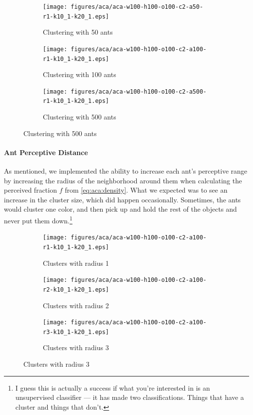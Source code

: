 \documentclass[12pt]{article}
\begin{document}
\begin{figure}[H]
    \begin{subfigure}[b]{0.32\textwidth}
        \centering
        \texttt{[image: figures/aca/aca-w100-h100-o100-c2-a50-r1-k10\_1-k20\_1.eps]}
        \caption{Clustering with 50 ants}\label{fig:aca:num-ants-50}
    \end{subfigure}
    \begin{subfigure}[b]{0.32\textwidth}
        \centering
        \texttt{[image: figures/aca/aca-w100-h100-o100-c2-a100-r1-k10\_1-k20\_1.eps]}
        \caption{Clustering with 100 ants}\label{fig:aca:num-ants-100}
    \end{subfigure}
    \begin{subfigure}[b]{0.32\textwidth}
        \centering
        \texttt{[image: figures/aca/aca-w100-h100-o100-c2-a500-r1-k10\_1-k20\_1.eps]}
        \caption{Clustering with 500 ants}\label{fig:aca:num-ants-200}
    \end{subfigure}
\end{figure}

\paragraph{Ant Perceptive Distance} As mentioned, we implemented the ability to increase each ant's perceptive range by increasing the radius of the neighborhood around them when calculating the perceived fraction $f$ from \autoref{eq:aca:density}.
What we expected was to see an increase in the cluster size, which did happen occasionally.
Sometimes, the ants would cluster one color, and then pick up and hold the rest of the objects and never put them down.\footnote{I guess this is actually a success if what you're interested in is an unsupervised classifier --- it has made two classifications. Things that have a cluster and things that don't.}

\begin{figure}[H]
    \begin{subfigure}[b]{0.32\textwidth}
        \centering
        \texttt{[image: figures/aca/aca-w100-h100-o100-c2-a100-r1-k10\_1-k20\_1.eps]}
        \caption{Clusters with radius 1}\label{fig:aca:radius-1}
    \end{subfigure}
    \begin{subfigure}[b]{0.32\textwidth}
        \centering
        \texttt{[image: figures/aca/aca-w100-h100-o100-c2-a100-r2-k10\_1-k20\_1.eps]}
        \caption{Clusters with radius 2}\label{fig:aca:radius-2}
    \end{subfigure}
    \begin{subfigure}[b]{0.32\textwidth}
        \centering
        \texttt{[image: figures/aca/aca-w100-h100-o100-c2-a100-r3-k10\_1-k20\_1.eps]}
        \caption{Clusters with radius 3}\label{fig:aca:radius-3}
    \end{subfigure}
\end{figure}
\end{document}
